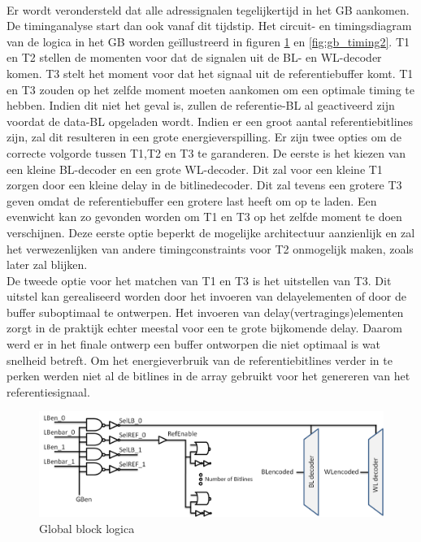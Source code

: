 \paragraph{}
Er wordt verondersteld dat alle adressignalen tegelijkertijd in het GB aankomen. De timinganalyse start dan ook vanaf dit tijdstip. Het circuit- en timingsdiagram van de logica in het GB worden geïllustreerd in figuren \ref{fig:gb_timing1} en \ref{fig:gb_timing2}. T1 en T2 stellen de momenten voor dat de signalen uit de BL- en WL-decoder komen. T3 stelt het moment voor dat het signaal uit de referentiebuffer komt. T1 en T3 zouden op het zelfde moment moeten aankomen om een optimale timing te hebben. Indien dit niet het geval is, zullen de referentie-BL al geactiveerd zijn voordat de data-BL opgeladen wordt. Indien er een groot aantal referentiebitlines zijn, zal dit resulteren in een grote energieverspilling. Er zijn twee opties om de correcte volgorde tussen T1,T2 en T3 te garanderen. De eerste is het kiezen van een kleine BL-decoder en een grote WL-decoder. Dit zal voor een kleine T1 zorgen door een kleine delay in de bitlinedecoder. Dit zal tevens een grotere T3 geven omdat de referentiebuffer een grotere last heeft om op te laden. Een evenwicht kan zo gevonden worden om T1 en T3 op het zelfde moment te doen verschijnen. Deze eerste optie beperkt de mogelijke architectuur aanzienlijk en zal het verwezenlijken van andere timingconstraints voor T2 onmogelijk maken, zoals later zal blijken.\\ 
De tweede optie voor het matchen van T1 en T3 is het uitstellen van T3. Dit uitstel kan gerealiseerd worden door het invoeren van delayelementen of door de buffer suboptimaal te ontwerpen. Het invoeren van delay(vertragings)elementen zorgt in de praktijk echter meestal voor een te grote bijkomende delay. Daarom werd er in het finale ontwerp een buffer ontworpen die niet optimaal is wat snelheid betreft. Om het energieverbruik van de referentiebitlines verder in te perken werden niet al de bitlines in de array gebruikt voor het genereren van het referentiesignaal.

\begin{figure}[!ht]
  \centering
  \includegraphics[scale=0.6]{../fig/hfdstk-timing-gb1.png}
  \caption[Global block:logica]{Global block logica}
  \label{fig:gb_timing1}
\end{figure}

